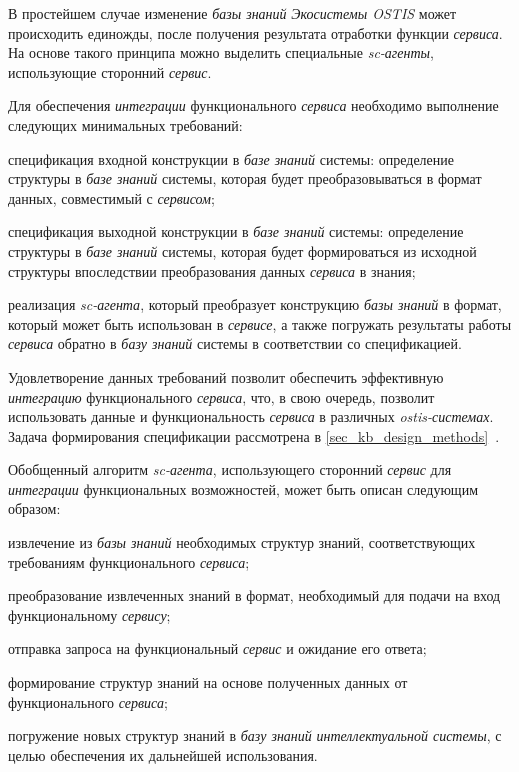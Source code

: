 В простейшем случае изменение \textit{базы знаний} \textit{Экосистемы OSTIS} может происходить единожды, после получения результата отработки функции \textit{сервиса}. На основе такого принципа можно выделить специальные \textit{sc-агенты}, использующие сторонний \textit{сервис}. 

Для обеспечения \textit{интеграции} функционального \textit{сервиса} необходимо выполнение следующих минимальных требований:
\begin{textitemize}
    \item спецификация входной конструкции в \textit{базе знаний} системы: определение структуры в \textit{базе знаний} системы, которая будет преобразовываться в формат данных, совместимый с \textit{сервисом};
    \item спецификация выходной конструкции в \textit{базе знаний} системы: определение структуры в \textit{базе знаний} системы, которая будет формироваться из исходной структуры впоследствии преобразования данных \textit{сервиса} в знания;
    \item реализация \textit{sc-агента}, который преобразует конструкцию \textit{базы знаний} в формат, который может быть использован в \textit{сервисе}, а также погружать результаты работы \textit{сервиса} обратно в \textit{базу знаний} системы в соответствии со спецификацией.
\end{textitemize}

Удовлетворение данных требований позволит обеспечить эффективную \textit{интеграцию} функционального \textit{сервиса}, что, в свою очередь, позволит использовать данные и функциональность \textit{сервиса} в различных \textit{ostis-системах}. Задача формирования спецификации рассмотрена в \ref{sec_kb_design_methods}~.

Обобщенный алгоритм \textit{sc-агента}, использующего сторонний \textit{сервис} для \textit{интеграции} функциональных возможностей, может быть описан следующим образом:

\begin{textitemize}
    \item извлечение из \textit{базы знаний} необходимых структур знаний, соответствующих требованиям функционального \textit{сервиса};
    \item преобразование извлеченных знаний в формат, необходимый для подачи на вход функциональному \textit{сервису};
    \item отправка запроса на функциональный \textit{сервис} и ожидание его ответа;
    \item формирование структур знаний на основе полученных данных от функционального \textit{сервиса};
    \item погружение новых структур знаний в \textit{базу знаний} \textit{интеллектуальной системы}, с целью обеспечения их дальнейшей использования.
\end{textitemize}

